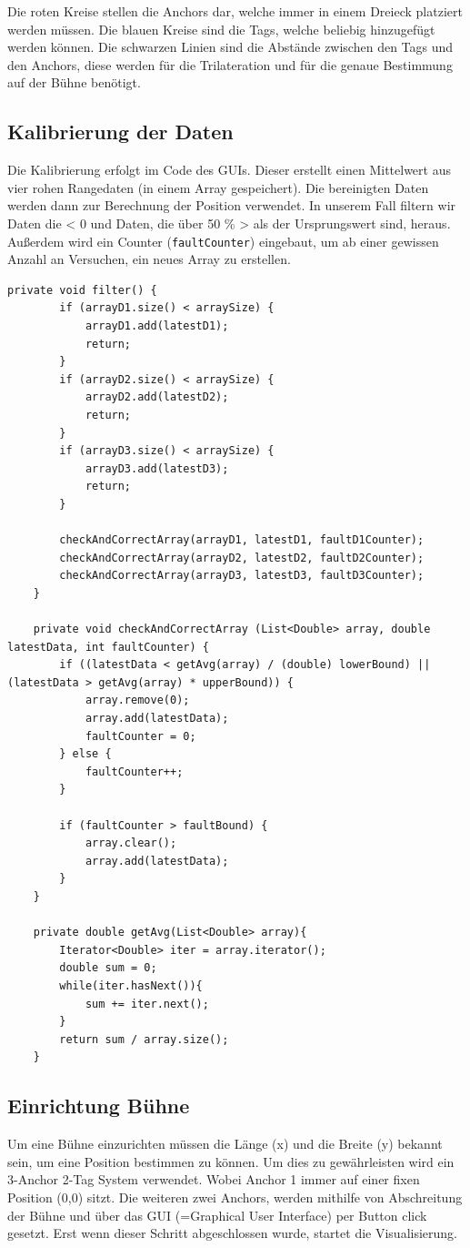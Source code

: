 Die roten Kreise stellen die Anchors dar, welche immer in einem Dreieck platziert werden müssen. Die blauen Kreise sind die Tags, welche beliebig hinzugefügt werden können. Die schwarzen Linien sind die Abstände zwischen den Tags und den Anchors, diese werden für die Trilateration und für die genaue Bestimmung auf der Bühne benötigt. 

\newpage
\subsection{Kalibrierung der Daten}
\label{KalibrierungDerDaten}
Die Kalibrierung erfolgt im Code des GUIs. Dieser erstellt einen Mittelwert aus vier rohen Rangedaten (in einem Array gespeichert). Die bereinigten Daten werden dann zur Berechnung der Position verwendet. In unserem Fall filtern wir Daten die < 0 und Daten, die über 50 \% > als der Ursprungswert sind, heraus. Außerdem wird ein Counter (\texttt{faultCounter}) eingebaut, um ab einer gewissen Anzahl an Versuchen, ein neues Array zu erstellen. 

\begin{lstlisting}[style=Java, caption=Kalibrierung der Daten, captionpos=b]
	private void filter() {
		if (arrayD1.size() < arraySize) {
			arrayD1.add(latestD1);
			return;
		}
		if (arrayD2.size() < arraySize) {
			arrayD2.add(latestD2);
			return;
		}
		if (arrayD3.size() < arraySize) {
			arrayD3.add(latestD3);
			return;
		}
		
		checkAndCorrectArray(arrayD1, latestD1, faultD1Counter);
		checkAndCorrectArray(arrayD2, latestD2, faultD2Counter);
		checkAndCorrectArray(arrayD3, latestD3, faultD3Counter);
	}
	
	private void checkAndCorrectArray (List<Double> array, double latestData, int faultCounter) {
		if ((latestData < getAvg(array) / (double) lowerBound) || (latestData > getAvg(array) * upperBound)) {
			array.remove(0);
			array.add(latestData);
			faultCounter = 0;
		} else {
			faultCounter++;
		}
		
		if (faultCounter > faultBound) {
			array.clear();
			array.add(latestData);
		}
	}
	
	private double getAvg(List<Double> array){
		Iterator<Double> iter = array.iterator();
		double sum = 0;
		while(iter.hasNext()){
			sum += iter.next();
		}
		return sum / array.size();
	}
\end{lstlisting}


\subsection{Einrichtung Bühne}
\label{Einrichtung Bühne}
Um eine Bühne einzurichten müssen die Länge (x) und die Breite (y) bekannt sein, um eine Position bestimmen zu können. Um dies zu gewährleisten wird ein 3-Anchor 2-Tag System verwendet. Wobei Anchor 1 immer auf einer fixen Position (0,0) sitzt. Die weiteren zwei Anchors, werden mithilfe von Abschreitung der Bühne und über das GUI (=Graphical User Interface) per Button click gesetzt. Erst wenn dieser Schritt abgeschlossen wurde, startet die Visualisierung.

